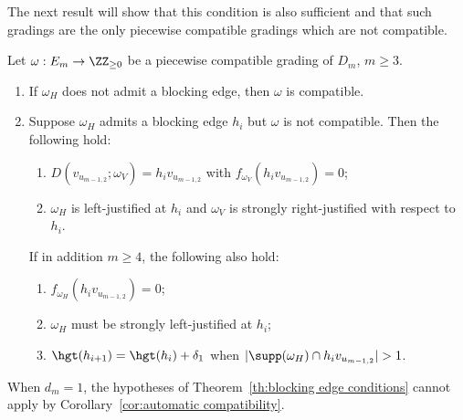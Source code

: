 The next result will show that this condition is also sufficient and that such gradings are the only piecewise compatible gradings which are not compatible.
\begin{theorem}
 \label{th:blocking edge conditions}
 Let $\omega:E_m\to\ZZ_{\ge0}$ be a piecewise compatible grading of $D_m$, $m\ge3$.
 \begin{enumerate}[label=(\alph*)]
 \item\label{theo3.20_1} If $\omega_H$ does not admit a blocking edge, then $\omega$ is compatible.
 \item\label{theo3.20_2} Suppose $\omega_H$ admits a blocking edge $h_i$ but $\omega$ is not compatible.
 Then the following hold:
 \begin{enumerate}[(\roman*)]
 \item\label{theo3.20_2_a} $D(v_{u_{m-1,2}};\omega_V)=h_iv_{u_{m-1,2}}$ with $f_{\omega_V}(h_iv_{u_{m-1,2}})=0$;
 \item\label{theo3.20_2_b} $\omega_H$ is left-justified at $h_i$ and $\omega_V$ is strongly right-justified with respect to $h_i$.
 \end{enumerate}
 If in addition $m\ge4$, the following also hold:
 \begin{enumerate}[(\roman*)]\addtocounter{enumii}{2}
 \item\label{theo3.20_2_c} $f_{\omega_H}(h_iv_{u_{m-1,2}})=0$;
 \item\label{theo3.20_2_d} $\omega_H$ must be strongly left-justified at $h_i$;
 \item\label{theo3.20_2_e} $\hgt(h_{i+1})=\hgt(h_i)+\delta_1$ when $|\supp(\omega_H)\cap h_iv_{u_{m-1,2}}|>1$.
 \end{enumerate}
 \end{enumerate}
\end{theorem}
\begin{remark}
 When $d_m=1$, the hypotheses of Theorem~\ref{th:blocking edge conditions} cannot apply by Corollary~\ref{cor:automatic compatibility}.
\end{remark}
